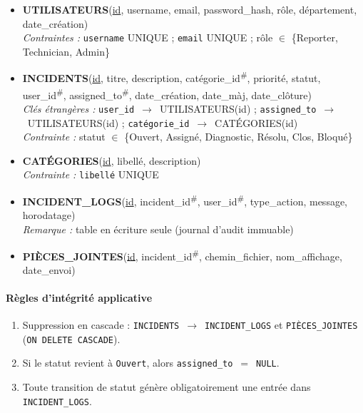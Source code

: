 \begin{itemize}
  \item \textbf{UTILISATEURS}(\underline{id}, username,
        email, password\_hash, rôle, département,
        date\_création)\\
        \textit{Contraintes :} \texttt{username} UNIQUE ;
        \texttt{email} UNIQUE ;
        rôle $\in$ \{Reporter, Technician, Admin\}

  \item \textbf{INCIDENTS}(\underline{id}, titre,
        description,
        catégorie\_id\textsuperscript{\#},
        priorité, statut,
        user\_id\textsuperscript{\#},
        assigned\_to\textsuperscript{\#},
        date\_création, date\_màj, date\_clôture)\\
        \textit{Clés étrangères :}
        \texttt{user\_id}~$\rightarrow$~UTILISATEURS(id) ;
        \texttt{assigned\_to}~$\rightarrow$~UTILISATEURS(id) ;
        \texttt{catégorie\_id}~$\rightarrow$~CATÉGORIES(id)\\
        \textit{Contrainte :}
        statut $\in$ \{Ouvert, Assigné, Diagnostic,
        Résolu, Clos, Bloqué\}

  \item \textbf{CATÉGORIES}(\underline{id}, libellé,
        description)\\
        \textit{Contrainte :} \texttt{libellé} UNIQUE

  \item \textbf{INCIDENT\_LOGS}(\underline{id},
        incident\_id\textsuperscript{\#},
        user\_id\textsuperscript{\#},
        type\_action, message, horodatage)\\
        \textit{Remarque :} table en écriture seule
        (journal d'audit immuable)

  \item \textbf{PIÈCES\_JOINTES}(\underline{id},
        incident\_id\textsuperscript{\#},
        chemin\_fichier, nom\_affichage, date\_envoi)
\end{itemize}

\paragraph{Règles d'intégrité applicative}
\begin{enumerate}
  \item[\textbf{R1}] Suppression en cascade :
        \texttt{INCIDENTS}~$\rightarrow$~\texttt{INCIDENT\_LOGS}
        et \texttt{PIÈCES\_JOINTES}
        (\texttt{ON DELETE CASCADE}).
  \item[\textbf{R2}] Si le statut revient à
        \texttt{Ouvert}, alors
        \texttt{assigned\_to}~$=$~\texttt{NULL}.
  \item[\textbf{R3}] Toute transition de statut génère
        obligatoirement une entrée dans
        \texttt{INCIDENT\_LOGS}.
\end{enumerate}

